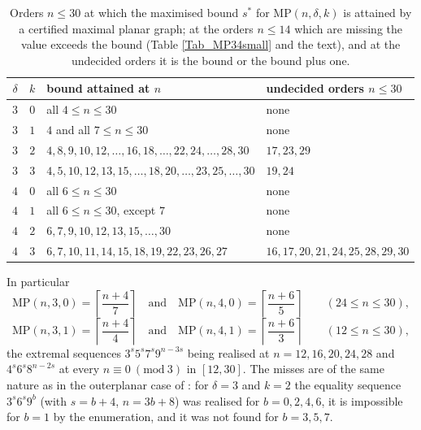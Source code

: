 \documentclass[12pt,a4paper]{article}%
\begin{document}
\begin{table}[ht]
\begin{center}
\begin{tabular}{|c|c|l|l|}
\hline
$\delta $ & $k$ & bound attained at $n$ & undecided orders $n\leq 30$\\ \hline
$3$ & $0$ & all $4\leq n\leq 30$ & none\\
$3$ & $1$ & $4$ and all $7\leq n\leq 30$ & none\\
$3$ & $2$ & $4,8,9,10,12,\ldots ,16,18,\ldots ,22,24,\ldots ,28,30$ & $17,23,29$\\
$3$ & $3$ & $4,5,10,12,13,15,\ldots ,18,20,\ldots ,23,25,\ldots ,30$ & $19,24$\\
$4$ & $0$ & all $6\leq n\leq 30$ & none\\
$4$ & $1$ & all $6\leq n\leq 30$, except $7$ & none\\
$4$ & $2$ & $6,7,9,10,12,13,15,\ldots ,30$ & none\\
$4$ & $3$ & $6,7,10,11,14,15,18,19,22,23,26,27$ & $16,17,20,21,24,25,28,29,30$\\ \hline
\end{tabular}
\end{center}
\caption{Orders $n\leq 30$ at which the maximised bound $s^{\ast }$ for $\mathrm{MP}(n,\delta ,k)$ is
attained by a certified maximal planar graph; at the orders $n\leq 14$ which are missing the value exceeds
the bound (Table \ref{Tab_MP34small} and the text), and at the undecided orders it is the bound or the
bound plus one.}%
\label{Tab_MP34}%
\end{table}

In particular
\[
\mathrm{MP}(n,3,0)=\left\lceil \frac{n+4}{7}\right\rceil \quad \text{and}\quad \mathrm{MP}(n,4,0)=%
\left\lceil \frac{n+6}{5}\right\rceil \qquad (24\leq n\leq 30),
\]
\[
\mathrm{MP}(n,3,1)=\left\lceil \frac{n+4}{4}\right\rceil \quad \text{and}\quad \mathrm{MP}(n,4,1)=%
\left\lceil \frac{n+6}{3}\right\rceil \qquad (12\leq n\leq 30),
\]
the extremal sequences $3^{s}5^{s}7^{s}9^{n-3s}$ being realised at $n=12,16,20,24,28$ and
$4^{s}6^{s}8^{n-2s}$ at every $n\equiv 0\ (\mathrm{mod}\ 3)$ in $[12,30]$. The misses are of the same
nature as in the outerplanar case of \cite{P1}: for $\delta =3$ and $k=2$ the equality
sequence $3^{s}6^{s}9^{b}$ (with $s=b+4$, $n=3b+8$) was realised for $b=0,2,4,6$, it is impossible
for $b=1$ by the enumeration, and it was not found for $b=3,5,7$.
\end{document}
